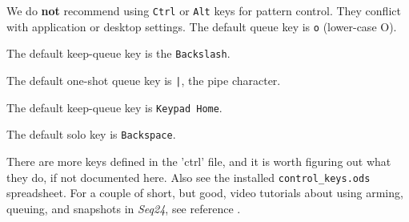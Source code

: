    We do \textbf{not}
   recommend using \texttt{Ctrl} or \texttt{Alt}
   keys for pattern control.  They conflict with application or desktop
   settings.
   The default queue key is \texttt{o} (lower-case O).

   The default keep-queue key is the \texttt{Backslash}.

   The default one-shot queue key is \texttt{|}, the pipe character.

   The default keep-queue key is \texttt{Keypad Home}.

   The default solo key is \texttt{Backspace}.

   \begin{comment}


   Before pressing the "keep queue" key, patterns 33 ("\textbf{q}")
   and 34 ("\textbf{a}") are
   unmuted, while the desired replace pattern, 32 ("\textbf{1}") is off.
   Then the user presses (and holds) the "replace" key, then clicks the
   "\textbf{1}" key.
   This puts all unmuted patterns, plus the muted
   replace pattern as well, into queue mode, as shown by the grey panels.
   When the progress bar reaches the end of the pattern, pattern 32 will go on,
   and patterns 33 and 34 will go off.
   If the replace-pattern is already on, it is not queued, as
   there's no need to turn it on.

   If, while in queue mode, the replace key is held and
   "\textbf{1}" is pressed again,
   the other patterns will be queued, and will turn on again.  Thus, the
   solo status of the replace pattern can be toggled at will, until queue mode
   is exited by pressing and releasing the normal "queue" key.
   If the replace key is \textsl{not} held down, and another pattern's replace
   hot-key is pressed, that pattern will be queued normally.
   If one wants to change the solo functionality to a different pattern,
   simple hold the replace key and click on a different pattern.  The new
   arrangement of soloing is memorized.
   One can clear the queue mode by pressing the normal queue key.

   \end{comment}

   There are more keys defined in the 'ctrl' file, and it is
   worth figuring out what they do, if not documented here.
   Also see the installed \texttt{control\_keys.ods} spreadsheet.
   For a couple of short, but good, video tutorials about using arming,
   queuing, and snapshots in \textsl{Seq24}, see reference \cite{wootangent1}.

